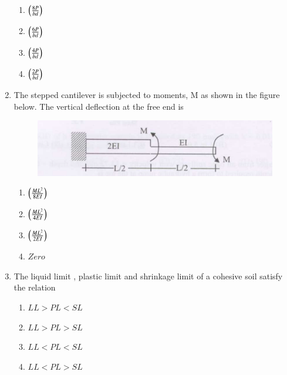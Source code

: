 \documentclass[journal]{IEEEtran}
\begin{document}
\begin{enumerate}
\begin{multicols}{2}
\begin{enumerate}
\item $\left(\frac{8P}{bd}\right)$
\vspace{0.1cm}
\item $\left(\frac{6P}{bd}\right)$
\item $\left(\frac{4P}{bd}\right)$
\vspace{0.1cm}
\item $\left(\frac{2P}{bd}\right)$
\end{enumerate}     
\end{multicols}

\item The stepped cantilever is subjected to moments, M as shown in the figure below. The vertical deflection at the free end  is \textbf{}

\begin{figure}[h]
    \centering
    \includegraphics[width=0.8\columnwidth]{figs/fig3.png} 

\end{figure}
\begin{multicols}{2}

\begin{enumerate}
\item $\left(\frac{ML^2}{8EI}\right)$
\vspace{0.1cm}
\item $\left(\frac{ML^2}{4EI}\right)$
\item $\left(\frac{ML^2}{2EI}\right)$
\vspace{0.1cm}
\item $Zero$
\end{enumerate}     
\end{multicols}

\item The liquid limit , plastic limit  and shrinkage limit  of a cohesive soil satisfy the relation \textbf{}

\begin{multicols}{2}

\begin{enumerate}
\item $LL > PL < SL$
\vspace{0.1cm}
\item $LL > PL > SL$
\item $LL < PL < SL$
\vspace{0.1cm}
\item $LL < PL > SL$
\end{enumerate}     
\end{multicols}


\end{enumerate}
\end{document}
